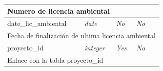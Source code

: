 \begin{longtable}{|l|l|l|l|l|}
	\multicolumn{ 5}{|l|}{Numero de licencia ambiental} \\ \hline
		date\_lic\_ambiental & \textit{date} & \textit{No} & \textit{No} & \textit{} \\ \hline

	\multicolumn{ 5}{|l|}{Fecha de finalización de ultima licencia ambiental} \\ \hline
		proyecto\_id & \textit{integer} & \textit{Yes} & \textit{No} & \textit{} \\ \hline

	\multicolumn{ 5}{|l|}{Enlace con la tabla proyecto\_id} \\ \hline
\end{longtable}


